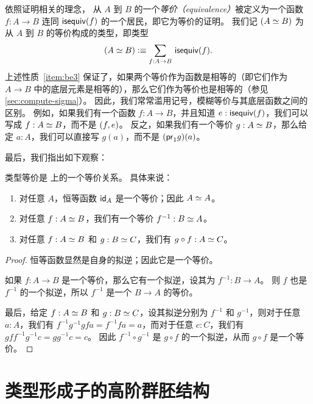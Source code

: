 依照证明相关的理念，
%
从 $A$ 到 $B$ 的一个\emph{等价（equivalence）}被定义为一个函数 $f:A\to B$ 连同 $\isequiv (f)$ 的一个居民，即它为等价的证明。
我们记 $(\eqv A B)$ 为从 $A$ 到 $B$ 的等价构成的类型，即类型
\begin{equation}\label{eq:eqv}
  (\eqv A B) \defeq \sm{f:A\to B} \isequiv(f).
\end{equation}
上述性质~\ref{item:be3} 保证了，如果两个等价作为函数是相等的（即它们作为 $A\to B$ 中的底层元素是相等的），那么它们作为等价也是相等的（参见 \cref{sec:compute-sigma}）。
因此，我们常常滥用记号，模糊等价与其底层函数之间的区别。
例如，如果我们有一个函数 $f:A\to B$，并且知道 $e:\isequiv(f)$，我们可以写成 $f:\eqv A B$，而不是 $\tup{f}{e}$。
反之，如果我们有一个等价 $g:\eqv A B$，那么给定 $a:A$，我们可以直接写 $g(a)$，而不是 $(\proj1 g)(a)$。

最后，我们指出如下观察：

\begin{lem}\label{thm:equiv-eqrel}
  类型等价是 \type 上的一个等价关系。
  具体来说：
  \begin{enumerate}
  \item 对任意 $A$，恒等函数 $\idfunc[A]$ 是一个等价；因此 $\eqv A A$。
  \item 对任意 $f:\eqv A B$，我们有一个等价 $f^{-1} : \eqv B A$。
  \item 对任意 $f:\eqv A B$ 和 $g:\eqv B C$，我们有 $g\circ f : \eqv A C$。
  \end{enumerate}
\end{lem}

\begin{proof}
  恒等函数显然是自身的拟逆；因此它是一个等价。

  如果 $f:A\to B$ 是一个等价，那么它有一个拟逆，设其为 $f^{-1}:B\to A$。
  则 $f$ 也是 $f^{-1}$ 的一个拟逆，所以 $f^{-1}$ 是一个 $B\to A$ 的等价。

  最后，给定 $f:\eqv A B$ 和 $g:\eqv B C$，设其拟逆分别为 $f^{-1}$ 和 $g^{-1}$，则对于任意 $a:A$，我们有 $f^{-1} g^{-1} g f a = f^{-1} f a = a$，而对于任意 $c:C$，我们有 $g f f^{-1} g^{-1} c = g g^{-1} c = c$。
  因此 $f^{-1} \circ g^{-1}$ 是 $g\circ f$ 的一个拟逆，从而 $g\circ f$ 是一个等价。
\end{proof}

%

\section{类型形成子的高阶群胚结构}
\label{sec:computational}

